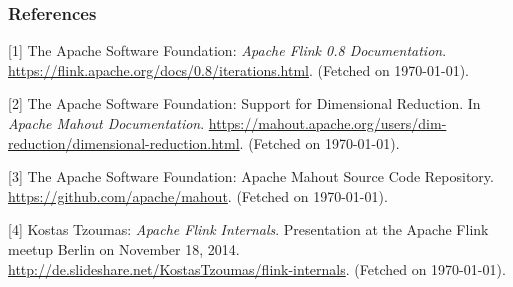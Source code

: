 \subsubsection*{References}


\small{
[1] The Apache Software Foundation: {\it Apache Flink 0.8 Documentation}. 
\url{https://flink.apache.org/docs/0.8/iterations.html}. (Fetched on \today).

[2] The Apache Software Foundation: Support for Dimensional Reduction. In
{\it Apache Mahout Documentation}.
\url{https://mahout.apache.org/users/dim-reduction/dimensional-reduction.html}.
(Fetched on \today).

[3] The Apache Software Foundation: Apache Mahout Source Code Repository.
\url{https://github.com/apache/mahout}. (Fetched on \today).

[4] Kostas Tzoumas: {\it Apache Flink Internals}. Presentation at the Apache
Flink meetup Berlin on November 18, 2014.
\url{http://de.slideshare.net/KostasTzoumas/flink-internals}. (Fetched on \today).
}